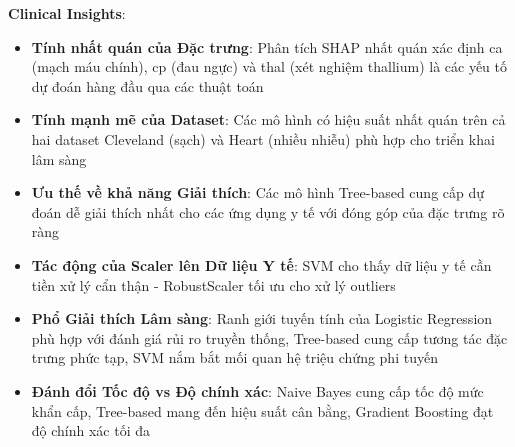 \textbf{Clinical Insights}:
\begin{itemize}[leftmargin=*]
    \item \textbf{Tính nhất quán của Đặc trưng}: Phân tích SHAP nhất quán xác định ca (mạch máu chính), cp (đau ngực) và thal (xét nghiệm thallium) là các yếu tố dự đoán hàng đầu qua các thuật toán
    \item \textbf{Tính mạnh mẽ của Dataset}: Các mô hình có hiệu suất nhất quán trên cả hai dataset Cleveland (sạch) và Heart (nhiều nhiễu) phù hợp cho triển khai lâm sàng
    \item \textbf{Ưu thế về khả năng Giải thích}: Các mô hình Tree-based cung cấp dự đoán dễ giải thích nhất cho các ứng dụng y tế với đóng góp của đặc trưng rõ ràng
    \item \textbf{Tác động của Scaler lên Dữ liệu Y tế}: SVM cho thấy dữ liệu y tế cần tiền xử lý cẩn thận - RobustScaler tối ưu cho xử lý outliers
    \item \textbf{Phổ Giải thích Lâm sàng}: Ranh giới tuyến tính của Logistic Regression phù hợp với đánh giá rủi ro truyền thống, Tree-based cung cấp tương tác đặc trưng phức tạp, SVM nắm bắt mối quan hệ triệu chứng phi tuyến
    \item \textbf{Đánh đổi Tốc độ vs Độ chính xác}: Naive Bayes cung cấp tốc độ mức khẩn cấp, Tree-based mang đến hiệu suất cân bằng, Gradient Boosting đạt độ chính xác tối đa
\end{itemize}

